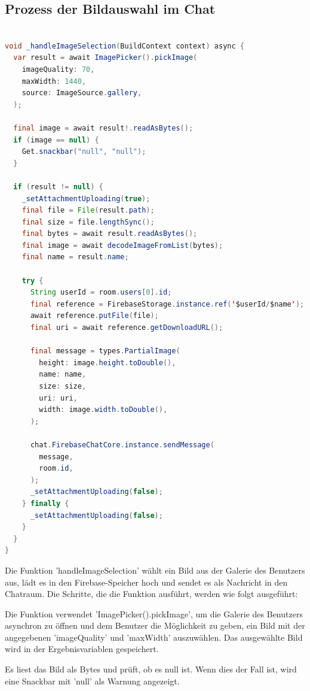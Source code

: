 \subsection{Prozess der Bildauswahl im Chat}

\begin{lstlisting}[language=Java,caption=Prozess der Bildauswahl und -verarbeitung,label=lst:fotoSelektion]  

void _handleImageSelection(BuildContext context) async {
  var result = await ImagePicker().pickImage(
    imageQuality: 70,
    maxWidth: 1440,
    source: ImageSource.gallery,
  );

  final image = await result!.readAsBytes();
  if (image == null) {
    Get.snackbar("null", "null");
  }

  if (result != null) {
    _setAttachmentUploading(true);
    final file = File(result.path);
    final size = file.lengthSync();
    final bytes = await result.readAsBytes();
    final image = await decodeImageFromList(bytes);
    final name = result.name;

    try {
      String userId = room.users[0].id;
      final reference = FirebaseStorage.instance.ref('$userId/$name');
      await reference.putFile(file);
      final uri = await reference.getDownloadURL();

      final message = types.PartialImage(
        height: image.height.toDouble(),
        name: name,
        size: size,
        uri: uri,
        width: image.width.toDouble(),
      );

      chat.FirebaseChatCore.instance.sendMessage(
        message,
        room.id,
      );
      _setAttachmentUploading(false);
    } finally {
      _setAttachmentUploading(false);
    }
  }
}

\end{lstlisting}

Die Funktion 'handleImageSelection' wählt ein Bild aus der Galerie des Benutzers aus, lädt es in den Firebase-Speicher hoch und sendet es als Nachricht in den Chatraum. Die Schritte, die die Funktion ausführt, werden wie folgt ausgeführt:

Die Funktion verwendet 'ImagePicker().pickImage', um die Galerie des Benutzers asynchron zu öffnen und dem Benutzer die Möglichkeit zu geben, ein Bild mit der angegebenen 'imageQuality' und 'maxWidth' auszuwählen. Das ausgewählte Bild wird in der Ergebnisvariablen gespeichert.

Es liest das Bild als Bytes und prüft, ob es null ist. Wenn dies der Fall ist, wird eine Snackbar mit 'null' als Warnung angezeigt.

